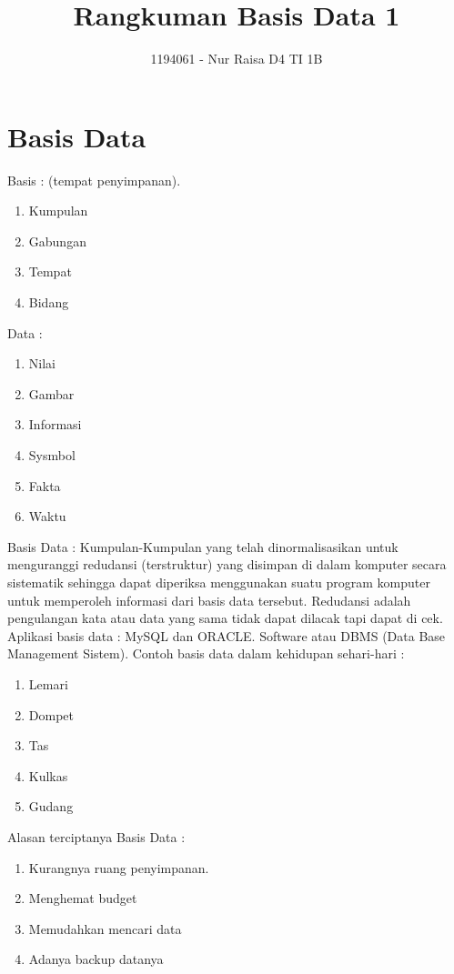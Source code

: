 \documentclass{article}
\title{Rangkuman Basis Data 1}
\author{1194061 - Nur Raisa D4 TI 1B}
\date
\begin{document}
\maketitle

\section{Basis Data}
Basis : (tempat penyimpanan).
\begin{enumerate}
    \item Kumpulan
    \item Gabungan
    \item Tempat
    \item Bidang
\end{enumerate}
Data :
\begin{enumerate}
    \item   Nilai
    \item   Gambar
    \item   Informasi
    \item   Sysmbol
    \item   Fakta
    \item   Waktu
\end{enumerate}
Basis Data : Kumpulan-Kumpulan yang telah dinormalisasikan untuk menguranggi redudansi (terstruktur) yang disimpan di dalam komputer secara sistematik sehingga dapat diperiksa menggunakan suatu program komputer untuk memperoleh informasi dari basis data tersebut. 
Redudansi adalah pengulangan kata atau data yang sama tidak dapat dilacak tapi dapat di cek.
Aplikasi basis data : MySQL dan ORACLE.
Software atau DBMS (Data Base Management Sistem).
Contoh basis data dalam kehidupan sehari-hari :
\begin{enumerate}
    \item Lemari
    \item Dompet
    \item Tas
    \item Kulkas
    \item Gudang
\end{enumerate}
Alasan terciptanya Basis Data :
\begin{enumerate}
    \item Kurangnya ruang penyimpanan.
    \item Menghemat budget
    \item Memudahkan mencari data
    \item Adanya backup datanya
\end{enumerate}
\end{document}
